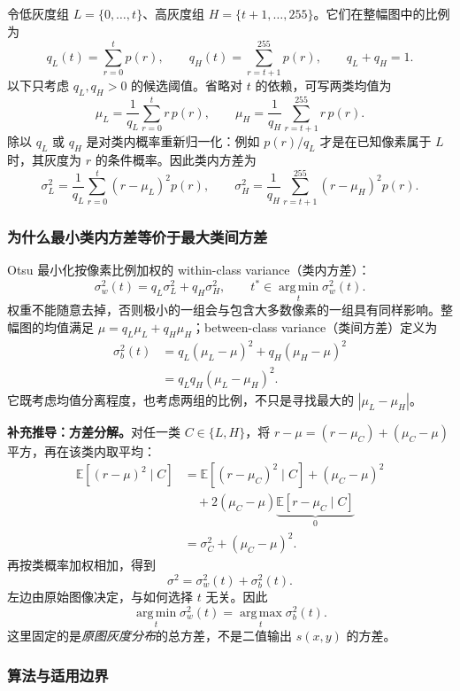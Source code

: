 令低灰度组 $L=\{0,\ldots,t\}$、高灰度组 $H=\{t+1,\ldots,255\}$。它们在整幅图中的比例为
\[
  q_L(t)=\sum_{r=0}^{t}p(r),\qquad
  q_H(t)=\sum_{r=t+1}^{255}p(r),\qquad q_L+q_H=1.
\]
以下只考虑 $q_L,q_H>0$ 的候选阈值。省略对 $t$ 的依赖，可写两类均值为
\[
  \mu_L=\frac{1}{q_L}\sum_{r=0}^{t}r\,p(r),\qquad
  \mu_H=\frac{1}{q_H}\sum_{r=t+1}^{255}r\,p(r).
\]
除以 $q_L$ 或 $q_H$ 是对类内概率重新归一化：例如 $p(r)/q_L$ 才是在已知像素属于 $L$ 时，其灰度为 $r$ 的条件概率。因此类内方差为
\[
  \sigma_L^2=\frac{1}{q_L}\sum_{r=0}^{t}(r-\mu_L)^2p(r),\qquad
  \sigma_H^2=\frac{1}{q_H}\sum_{r=t+1}^{255}(r-\mu_H)^2p(r).
\]

\subsubsection*{为什么最小类内方差等价于最大类间方差}

Otsu 最小化按像素比例加权的 within-class variance（类内方差）：
\[
  \boxed{\sigma_w^2(t)=q_L\sigma_L^2+q_H\sigma_H^2},\qquad
  t^*\in\operatorname*{arg\,min}_t\sigma_w^2(t).
\]
权重不能随意去掉，否则极小的一组会与包含大多数像素的一组具有同样影响。整幅图的均值满足 $\mu=q_L\mu_L+q_H\mu_H$；between-class variance（类间方差）定义为
\begin{align*}
  \sigma_b^2(t)
  &=q_L(\mu_L-\mu)^2+q_H(\mu_H-\mu)^2\\
  &=\boxed{q_Lq_H(\mu_L-\mu_H)^2}.
\end{align*}
它既考虑均值分离程度，也考虑两组的比例，不只是寻找最大的 $|\mu_L-\mu_H|$。

\textbf{补充推导：方差分解。}对任一类 $C\in\{L,H\}$，将
$r-\mu=(r-\mu_C)+(\mu_C-\mu)$ 平方，再在该类内取平均：
\[
\begin{aligned}
  \mathbb E[(r-\mu)^2\mid C]
  &=\mathbb E[(r-\mu_C)^2\mid C]+(\mu_C-\mu)^2\\
  &\quad+2(\mu_C-\mu)\underbrace{\mathbb E[r-\mu_C\mid C]}_{0}\\
  &=\sigma_C^2+(\mu_C-\mu)^2.
\end{aligned}
\]
再按类概率加权相加，得到
\[
  \boxed{\sigma^2=\sigma_w^2(t)+\sigma_b^2(t)}.
\]
左边由原始图像决定，与如何选择 $t$ 无关。因此
\[
  \operatorname*{arg\,min}_t\sigma_w^2(t)
  =\operatorname*{arg\,max}_t\sigma_b^2(t).
\]
这里固定的是\emph{原图灰度分布}的总方差，不是二值输出 $s(x,y)$ 的方差。

\subsubsection*{算法与适用边界}


